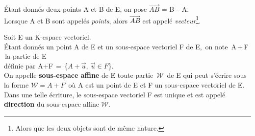 \noindent Étant donnés deux points A et B de E, on pose \(\overrightarrow{AB}\) = B\,$-$\,A.\vspace{0.1cm}\\
Lorsque A et B sont appelés \emph{points}, alors \(\overrightarrow{AB}\) est appelé \emph{vecteur}\footnote{Alors que les deux objets sont de même nature.}.

\vspace{1.3cm}

Soit E un K-espace vectoriel.\vspace{0.1cm} \\
\noindent Étant donnés un point A de E et un sous-espace vectoriel F de E, \,on note\, A\,$+$\,F \,la partie de E\vspace{0.1cm}\\
définie par A+F\,$=$\,\{\(A+\vec{u},\ \vec{u}\in F \)\}.\vspace{0.3cm} \\
On appelle \textbf{sous-espace affine} de E toute partie \(\,\mathcal{W}\,\) de E qui peut s'écrire sous la forme \(\mathcal{W}=A+F\,\) où A est un point de E et F un sous-espace vectoriel de E.\vspace{0.1cm} \\
Dans une telle écriture, le sous-espace vectoriel F est unique et est appelé \textbf{direction} du sous-espace affine \(\mathcal{W}\).

\vspace{1.3cm}

